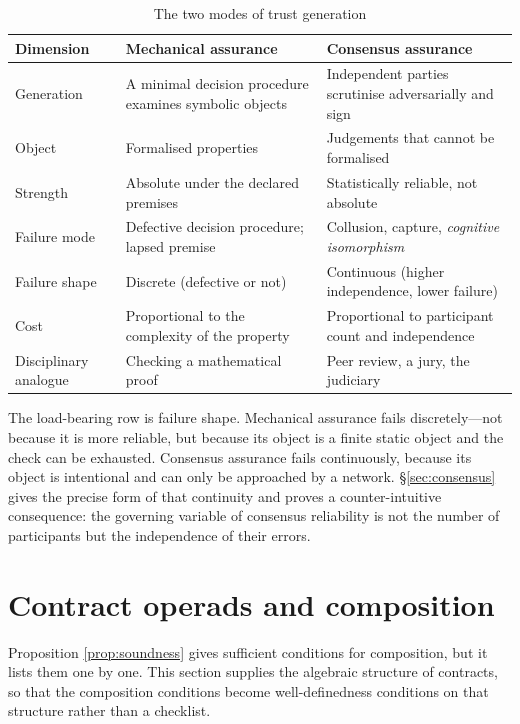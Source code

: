 \begin{table}[htbp]
\centering
\caption{The two modes of trust generation}\label{tab:twotrust}
\begin{tabular}{L{2.7cm}L{5.3cm}L{5.3cm}}
\toprule
\textbf{Dimension} & \textbf{Mechanical assurance} & \textbf{Consensus assurance} \\
\midrule
Generation & A minimal decision procedure examines symbolic objects &
  Independent parties scrutinise adversarially and sign \\
Object & Formalised properties & Judgements that cannot be formalised \\
Strength & Absolute under the declared premises & Statistically reliable, not absolute \\
Failure mode & Defective decision procedure; lapsed premise &
  Collusion, capture, \emph{cognitive isomorphism} \\
Failure shape & Discrete (defective or not) & Continuous (higher independence, lower failure) \\
Cost & Proportional to the complexity of the property & Proportional to participant count and independence \\
Disciplinary analogue & Checking a mathematical proof & Peer review, a jury, the judiciary \\
\bottomrule
\end{tabular}
\end{table}

The load-bearing row is failure shape. Mechanical assurance fails discretely---not because
it is more reliable, but because its object is a finite static object and the check can be
exhausted. Consensus assurance fails continuously, because its object is intentional and
can only be approached by a network. \S\ref{sec:consensus} gives the precise form of that
continuity and proves a counter-intuitive consequence: the governing variable of consensus
reliability is not the number of participants but the independence of their errors.

\section{Contract operads and composition}\label{sec:operad}

Proposition \ref{prop:soundness} gives sufficient conditions for composition, but it lists
them one by one. This section supplies the algebraic structure of contracts, so that the
composition conditions become well-definedness conditions on that structure rather than a
checklist.


